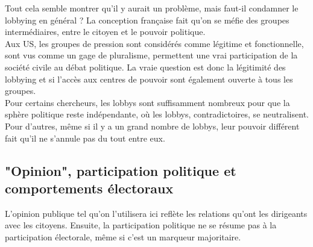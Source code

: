 \documentclass[10pt, a4paper, openany]{book}
\begin{document}
Tout cela semble montrer qu'il y aurait un problème, mais faut-il condamner le lobbying en général ? La conception française fait qu'on se méfie des groupes intermédiaires, entre le citoyen et le pouvoir politique. \\
Aux US, les groupes de pression sont considérés comme légitime et fonctionnelle, sont vus comme un gage de pluralisme, permettent une vrai participation de la société civile au débat politique. La vraie question est donc la légitimité des lobbying et si l'accès aux centres de pouvoir sont également ouverte à tous les groupes. \\
Pour certains chercheurs, les lobbys sont suffisamment nombreux pour que la sphère politique reste indépendante, où les lobbys, contradictoires, se neutralisent. Pour d'autres, même si il y a un grand nombre de lobbys, leur pouvoir différent fait qu'il ne s'annule pas du tout entre eux.

\subsection{"Opinion", participation politique et comportements électoraux}

L'opinion publique tel qu'on l'utilisera ici reflète les relations qu'ont les dirigeants avec les citoyens. Ensuite, la participation politique ne se résume pas à la participation électorale, même si c'est un marqueur majoritaire. 
\end{document}
